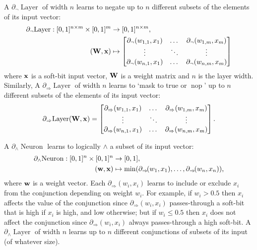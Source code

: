 \documentclass{article} %
\begin{document}
A $\partial_{\neg} \!\operatorname{Layer}$ of width $n$ learns to negate up to $n$ different subsets of the elements of its input vector:
\begin{equation*}
\begin{aligned}
\partial_{\neg} \!\operatorname{Layer}: [0,1]^{n \times m} \times [0,1]^{m} &\to [0,1]^{n \times m}, \\
({\bf W}, {\bf x}) &\mapsto 
\begin{bmatrix}
\partial_{\neg}(w_{1,1}, x_{1}) & \dots & \partial_{\neg}(w_{1,m}, x_{m}) \\
\vdots & \ddots & \vdots \\
\partial_{\neg}(w_{n,1}, x_{1}) & \dots & \partial_{\neg}(w_{n,m}, x_{m})
\end{bmatrix}
\end{aligned}
\end{equation*}
where ${\bf x}$ is a soft-bit input vector, ${\bf W}$ is a weight matrix and $n$ is the layer width. Similarly, A $\partial_{\Rightarrow} \!\operatorname{Layer}$ of width $n$ learns to `mask to true or $\operatorname{nop}$' up to $n$ different subsets of the elements of its input vector:
\begin{equation*}
\partial_{\Rightarrow} \!\operatorname{Layer}({\bf W}, {\bf x}) =
\begin{bmatrix}
\partial_{\Rightarrow}(w_{1,1}, x_{1}) & \dots & \partial_{\Rightarrow}(w_{1,m}, x_{m}) \\
\vdots & \ddots & \vdots \\
\partial_{\Rightarrow}(w_{n,1}, x_{1}) & \dots & \partial_{\Rightarrow}(w_{n,m}, x_{m})
\end{bmatrix}\text{.}
\end{equation*}

A $\partial_{\wedge}\!\operatorname{Neuron}$ learns to logically $\wedge$ a subset of its input vector:
\begin{equation*}
\begin{aligned}
\partial_{\wedge}\!\operatorname{Neuron}: [0,1]^{n} \times [0,1]^{n} &\to [0,1], \\
({\bf w}, {\bf x}) &\mapsto \min(\partial_{\Rightarrow}\!(w_{1}, x_{1}), \dots, \partial_{\Rightarrow}\!(w_{n}, x_{n}))\text{,}
\end{aligned}
\end{equation*}
where ${\bf w}$ is a weight vector. Each $\partial_{\Rightarrow}(w_{i},x_{i})$ learns to include or exclude $x_{i}$ from the conjunction depending on weight $w_{i}$. For example, if $w_{i}>0.5$ then $x_{i}$ affects the value of the conjunction since $\partial_{\Rightarrow}(w_{i},x_{i})$ passes-through a soft-bit that is high if $x_{i}$ is high, and low otherwise; but if $w_{i} \leq 0.5$ then $x_{i}$ does not affect the conjunction since $\partial_{\Rightarrow}(w_{i},x_{i})$ always passes-through a high soft-bit. A $\partial_{\wedge}\!\operatorname{Layer}$ of width $n$ learns up to $n$ different conjunctions of subsets of its input (of whatever size).
\end{document}
